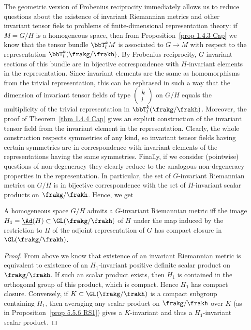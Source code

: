 The geometric version of Frobenius reciprocity immediately allows us to reduce questions about the existence of invariant Riemannian metrics and other invariant tensor fiels to problems of finite-dimensional representation theory: if $M=G\slash H$ is a homogeneous space, then from Proposition~\ref{prop 1.4.3 Cap} we know that the tensor bundle $\bbT^k_lM$ is associated to $G\to M$ with respect to the representation $\bbT^k_l(\frakg\slash \frakh)$. By Frobenius reciprocity, $G$-invariant sections of this bundle are in bijective correspondence with $H$-invariant elements in the representation. Since invariant elements are the same as homomorphisms from the trivial representation, this can be rephrased in such a way that the dimension of invariant tensor fields of type $\left(\begin{smallmatrix}k\\l\end{smallmatrix}\right)$
on $G\slash H$ equals the multiplicity of the trivial representation in $\bbT^k_l(\frakg\slash\frakh)$. Moreover, the proof of Theorem~\ref{thm 1.4.4 Cap} gives an explicit construction of the invariant tensor field from the invariant element in the representation. Clearly, the whole construction respects symmetries of any kind, so invariant tensor fields having certain symmetries are in correspondence with invariant elements of the representations having the same symmetries. Finally, if we consider (pointwise) questions of non-degeneracy they clearly reduce to the analogous non-degeneracy properties in the representation. In particular, the set of $G$-invariant Riemannian metrics on $G\slash H$ is in bijective correspondence with the set of $H$-invariant scalar products on $\frakg\slash\frakh$. Hence, we get
\begin{cor}
    A homogeneous space $G\slash H$ admits a $G$-invariant Riemannian metric iff the image $H_1=\underline{\Ad}(H)\subset \GL(\frakg\slash\frakh)$ of $H$ under the map induced by the restriction to $H$ of the adjoint representation of $G$ has compact closure in $\GL(\frakg\slash\frakh)$.
\end{cor}
\begin{proof}
    From above we know that existence of an invariant Riemannian metric is equivalent to existence of an $H_1$-invariant positive definite scalar product on $\frakg\slash\frakh$. If such an scalar product exists, then $H_1$ is contained in the orthogonal group of this  product, which is compact. Hence $H_1$ has compact closure. Conversely, if $K\subset \GL(\frakg\slash\frakh)$ is a compact subgroup containing $H_1$, then averaging any scalar product on $\frakg\slash\frakh$ over $K$ (as in Proposition~\ref{prop 5.5.6 RS1}) gives a $K$-invariant and thus a $H_1$-invariant scalar product.
\end{proof}

